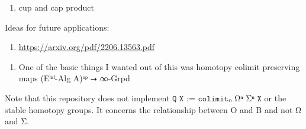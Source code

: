 \documentclass{book}
\theoremstyle{definition}
\newcounter{pcounter}
\newcounter{sectioncount}
\newcounter{subsectioncount}
\renewcommand{\section}[1]{\newpage\ \\ \ \\ \begin{center} \scalebox{1.5}{\texttt{\thesectioncount . #1}} \stepcounter{sectioncount} \setcounter{subsectioncount}{1} \end{center} \begin{center} \ \\ \ \\ \thispagestyle{empty} \end{center}}
\begin{document}
\begin{enumerate}
\item cup and cap product
\end{enumerate}

Ideas for future applications:

\begin{enumerate}
\item \url{https://arxiv.org/pdf/2206.13563.pdf}
\end{enumerate}

\begin{enumerate}
\item One of the basic things I wanted out of this was homotopy colimit preserving maps (Eⁱⁿᶠ-Alg A)ᵒᵖ ⭢ ∞-Grpd
\end{enumerate}

Note that this repository does not implement $\texttt{Q X := colimitₙ Ωⁿ Σⁿ X}$ or the stable homotopy groups. It concerns the relationship between O and B and not Ω and Σ.\\

\section{Contents}
\end{document}
